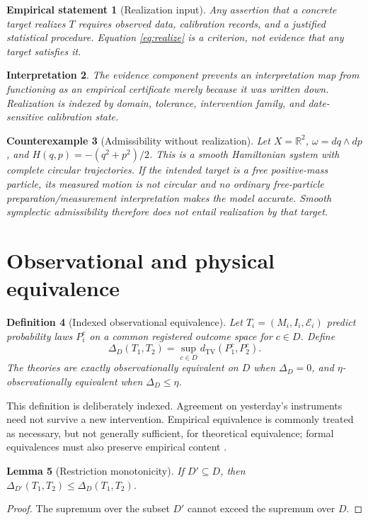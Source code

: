 \documentclass[11pt]{article}
\newtheorem{definition}{Definition}[section]
\newtheorem{lemma}[definition]{Lemma}
\newtheorem{interpretation}[definition]{Interpretation}
\newtheorem{empirical}[definition]{Empirical statement}
\newtheorem{counterexample}[definition]{Counterexample}
\newcommand{\TV}{d_{\mathrm{TV}}}
\newcommand{\R}{\mathbb R}
\begin{document}
\begin{empirical}[Realization input]
Any assertion that a concrete target realizes $T$ requires observed data, calibration records, and a justified statistical procedure.  Equation \eqref{eq:realize} is a criterion, not evidence that any target satisfies it.
\end{empirical}

\begin{interpretation}
The evidence component prevents an interpretation map from functioning as an empirical certificate merely because it was written down.  Realization is indexed by domain, tolerance, intervention family, and date-sensitive calibration state.
\end{interpretation}

\begin{counterexample}[Admissibility without realization]
Let $X=\R^2$, $\omega=dq\wedge dp$, and $H(q,p)=-(q^2+p^2)/2$.  This is a smooth Hamiltonian system with complete circular trajectories.  If the intended target is a free positive-mass particle, its measured motion is not circular and no ordinary free-particle preparation/measurement interpretation makes the model accurate.  Smooth symplectic admissibility therefore does not entail realization by that target.
\end{counterexample}

\section{Observational and physical equivalence}

\begin{definition}[Indexed observational equivalence]
Let $T_i=(M_i,I_i,\mathcal E_i)$ predict probability laws $P_i^c$ on a common registered outcome space for $c\in D$.  Define
\[
 \Delta_D(T_1,T_2)=\sup_{c\in D}\TV(P_1^c,P_2^c).
\]
The theories are exactly observationally equivalent on $D$ when $\Delta_D=0$, and $\eta$-observationally equivalent when $\Delta_D\leq\eta$.
\end{definition}

This definition is deliberately indexed.  Agreement on yesterday's instruments need not survive a new intervention.  Empirical equivalence is commonly treated as necessary, but not generally sufficient, for theoretical equivalence; formal equivalences must also preserve empirical content \cite{Weatherall2019,Weatherall2016}.

\begin{lemma}[Restriction monotonicity]
If $D'\subseteq D$, then $\Delta_{D'}(T_1,T_2)\leq\Delta_D(T_1,T_2)$.
\end{lemma}
\begin{proof}
The supremum over the subset $D'$ cannot exceed the supremum over $D$.
\end{proof}
\end{document}
